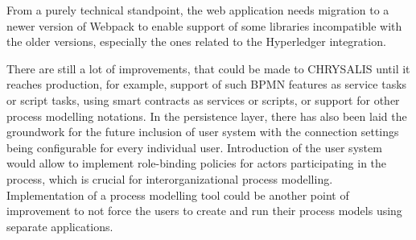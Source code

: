 From a purely technical standpoint, the web application needs migration to a newer version of Webpack to enable support of some libraries incompatible with the older versions, especially the ones related to the Hyperledger integration. 

There are still a lot of improvements, that could be made to CHRYSALIS until it reaches production, for example, support of such BPMN features as service tasks or script tasks, using smart contracts as services or scripts, or support for other process modelling notations. In the persistence layer, there has also been laid the groundwork for the future inclusion of user system with the connection settings being configurable for every individual user. Introduction of the user system would allow to implement role-binding policies for actors participating in the process, which is crucial for interorganizational process modelling.  Implementation of a process modelling tool could be another point of improvement to not force the users to create and run their process models using separate applications.